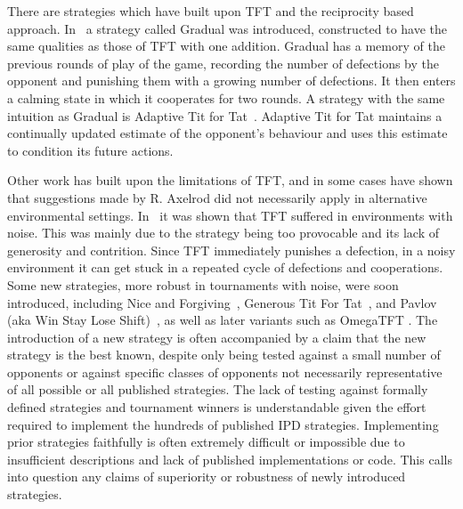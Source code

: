 \documentclass{article}
\begin{document}
There are strategies which have built upon TFT and the reciprocity based approach.
In~\cite{Beaufils1997} a strategy called Gradual was introduced, constructed to have the
same qualities as those of TFT with one addition. Gradual has a memory
of the previous rounds of play of the game, recording the number of defections
by the opponent and punishing them with a growing number of defections. It
then enters a calming state in which it cooperates for two rounds. A
strategy with the same intuition as Gradual is Adaptive Tit for
Tat~\cite{tzafestas-2000a}. Adaptive Tit for Tat maintains a continually updated estimate of the
opponent's behaviour and uses this estimate to condition its future actions.

Other work has built upon the limitations of TFT, and in some cases have shown
that suggestions made by R. Axelrod did not necessarily apply in alternative environmental settings.
In~\cite{Bendor1991, Donninger1986, Molander1985, Hammerstein1984} it was shown
that TFT suffered in environments with noise. This was
mainly due to the strategy being too provocable and its lack of generosity and contrition. Since TFT immediately
punishes a defection, in a noisy environment it can get stuck in a
repeated cycle of defections and cooperations. Some new strategies, more
robust in tournaments with noise, were soon introduced, including
Nice and Forgiving~\cite{Bendor1991}, Generous Tit For Tat~\cite{Nowak1992},
and Pavlov (aka Win Stay Lose Shift)~\cite{Nowak1993}, as well as later
variants such as OmegaTFT \cite{kendall2007iterated}. The introduction of a new strategy
is often accompanied by a claim that the new strategy is the best known, despite
only being tested against a small number of opponents or against specific classes of
opponents not necessarily representative of all possible or all published strategies.
The lack of testing against formally defined strategies and tournament winners
is understandable given the effort required to implement the hundreds of published IPD strategies.
Implementing prior strategies faithfully is often extremely difficult or
impossible due to insufficient descriptions and lack of published
implementations or code.
This calls into question any claims of superiority or robustness of newly introduced strategies.
\end{document}
